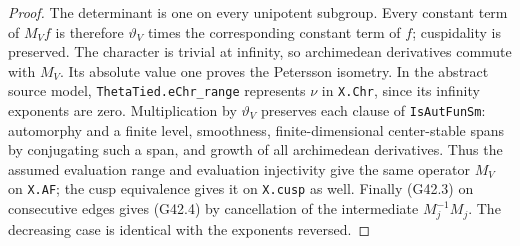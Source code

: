 \begin{proof}
The determinant is one on every unipotent subgroup.
Every constant term of $M_V f$ is therefore
$\vartheta_V$ times the corresponding constant term
of $f$; cuspidality is preserved.  The character is
trivial at infinity, so archimedean derivatives commute
with $M_V$.  Its absolute value one proves the
Petersson isometry.  In the abstract source model,
\texttt{ThetaTied.eChr\_range} represents $\nu$ in
\texttt{X.Chr}, since its infinity exponents are zero.
Multiplication by $\vartheta_V$ preserves each clause
of \texttt{IsAutFunSm}: automorphy and a finite level,
smoothness, finite-dimensional center-stable spans
by conjugating such a span, and growth of all
archimedean derivatives.  Thus the assumed evaluation
range and evaluation injectivity give the same
operator $M_V$ on \texttt{X.AF}; the cusp equivalence
gives it on \texttt{X.cusp} as well.
Finally (G42.3) on consecutive
edges gives (G42.4) by cancellation of the intermediate
$M_j^{-1}M_j$.  The decreasing case is identical with
the exponents reversed.
\end{proof}

